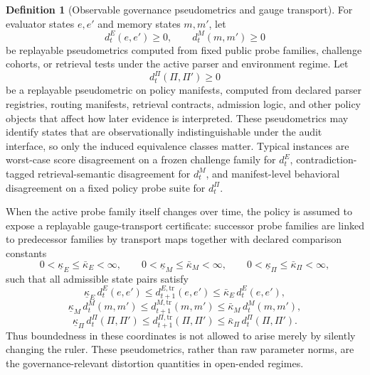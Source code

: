 \documentclass[11pt]{article}
\theoremstyle{definition}
\newtheorem{definition}[theorem]{Definition}
\newcommand{\1}{\mathbf{1}}
\begin{document}
\begin{definition}[Observable governance pseudometrics and gauge transport]\label{def:obs_pseudometrics}
For evaluator states $e,e'$ and memory states $m,m'$, let
\[
d_t^{E}(e,e')\ge 0,
\qquad
 d_t^{M}(m,m')\ge 0
\]
be replayable pseudometrics computed from fixed public probe families, challenge cohorts, or retrieval tests under the active parser and environment regime. Let
\[
d_t^{\Pi}(\Pi,\Pi')\ge 0
\]
be a replayable pseudometric on policy manifests, computed from declared parser registries, routing manifests, retrieval contracts, admission logic, and other policy objects that affect how later evidence is interpreted. These pseudometrics may identify states that are observationally indistinguishable under the audit interface, so only the induced equivalence classes matter. Typical instances are worst-case score disagreement on a frozen challenge family for $d_t^{E}$, contradiction-tagged retrieval-semantic disagreement for $d_t^{M}$, and manifest-level behavioral disagreement on a fixed policy probe suite for $d_t^{\Pi}$.

When the active probe family itself changes over time, the policy is assumed to expose a replayable gauge-transport certificate: successor probe families are linked to predecessor families by transport maps together with declared comparison constants
\[
0<\underline\kappa_E\le \bar\kappa_E<\infty,
\qquad
0<\underline\kappa_M\le \bar\kappa_M<\infty,
\qquad
0<\underline\kappa_\Pi\le \bar\kappa_\Pi<\infty,
\]
such that all admissible state pairs satisfy
\[
\underline\kappa_E\, d_t^{E}(e,e') \le d_{t+1}^{E,\mathrm{tr}}(e,e') \le \bar\kappa_E\, d_t^{E}(e,e'),
\]
\[
\underline\kappa_M\, d_t^{M}(m,m') \le d_{t+1}^{M,\mathrm{tr}}(m,m') \le \bar\kappa_M\, d_t^{M}(m,m'),
\]
\[
\underline\kappa_\Pi\, d_t^{\Pi}(\Pi,\Pi') \le d_{t+1}^{\Pi,\mathrm{tr}}(\Pi,\Pi') \le \bar\kappa_\Pi\, d_t^{\Pi}(\Pi,\Pi').
\]
Thus boundedness in these coordinates is not allowed to arise merely by silently changing the ruler. These pseudometrics, rather than raw parameter norms, are the governance-relevant distortion quantities in open-ended regimes.
\end{definition}
\end{document}
